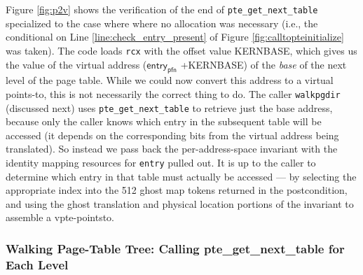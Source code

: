 Figure \ref{fig:p2v} shows the verification of the end of \lstinline|pte_get_next_table| specialized to the case where 
where no allocation was necessary (i.e., the conditional on Line \ref{line:check_entry_present} of Figure \ref{fig:calltopteinitialize} was taken).
The code loads \lstinline|rcx| with the offset value \textsf{KERNBASE}, which gives us the value of the virtual address ($\textsf{entry}_{\textsf{pfn}}$ \textsf{+KERNBASE})
of the \emph{base} of the next level of the page table.
While we could now convert this address to a virtual points-to, this is not necessarily the correct thing to do.
The caller \lstinline|walkpgdir| (discussed next) uses \lstinline|pte_get_next_table| to retrieve just the base address,
because only the caller knows which entry in the subsequent table will be accessed (it depends on the corresponding bits from the virtual
address being translated). So instead we pass back the per-address-space invariant with the identity mapping resources for \lstinline|entry|
pulled out. It is up to the caller to determine which entry in that table must actually
be accessed --- by selecting the appropriate index into the 512 ghost map tokens returned in the postcondition,
and using the ghost translation and physical location portions of the invariant to assemble a vpte-pointsto.



\subsubsection{Walking Page-Table Tree: Calling \textsf{pte\_get\_next\_table} for Each Level}
\label{wlkpgdir}


